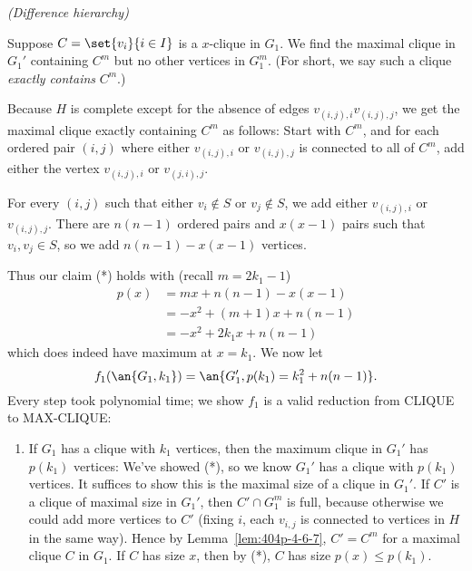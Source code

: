 \begin{problem}{\it(Difference hierarchy)}
\begin{enumerate}
Suppose $C=\set{v_i}{i\in I}$ is a $x$-clique in $G_1$. We find the maximal clique in $G_1'$ containing $C^m$ but no other vertices in $G_1^m$. (For short, we say such a clique \emph{exactly contains} $C^m$.)

Because $H$ is complete except for the absence of edges $v_{(i,j),i}v_{(i,j),j}$, we get the maximal clique exactly containing $C^m$ as follows: %
Start with $C^m$, and for each ordered pair $(i,j)$ where either $v_{(i,j),i}$ or $v_{(i,j),j}$ is connected to all of $C^m$, add either the vertex $v_{(i,j),i}$ or $v_{(j,i),j}$.

For every $(i,j)$ such that either $v_i\nin S$ or $v_j\nin S$, we add either $v_{(i,j),i}$ or $v_{(i,j),j}$. There are $n(n-1)$ ordered pairs and $x(x-1)$ pairs such that $v_i,v_j\in S$, so we add ${n(n-1)-x(x-1)}$ vertices.

Thus our claim (*) holds with (recall $m=2k_1-1$)
\begin{align*}
p(x)&=mx+n(n-1)-x(x-1)\\
&=-x^2+(m+1)x+n(n-1)\\
&=-x^2+2k_1x+n(n-1)
\end{align*}
which does indeed have maximum at $x=k_1$. 
We now let 
\[
f_1(\an{G_1,k_1})=\an{G_1',p(k_1)=k_1^2+n(n-1)}.
\]
Every step took polynomial time; we show $f_1$ is a valid reduction from CLIQUE to MAX-CLIQUE:
\begin{enumerate}
\item
If $G_1$ has a clique with $k_1$ vertices, then the maximum clique in $G_1'$ has $p(k_1)$ vertices: We've showed (*), so we know $G_1'$ has a clique with $p(k_1)$ vertices. It suffices to show this is the maximal size of a clique in $G_1'$. If $C'$ is a clique of maximal size in $G_1'$, then $C'\cap G_1^m$ is full, because otherwise we could add more vertices to $C'$ (fixing $i$, each $v_{i,j}$ is connected to vertices in $H$ in the same way). %
Hence by Lemma~\ref{lem:404p-4-6-7}, $C'=C^m$ for a maximal clique $C$ in $G_1$. If $C$ has size $x$, then
by (*), $C$ has size $p(x)\le p(k_1)$.


\end{enumerate}
\end{enumerate}
\end{problem}
